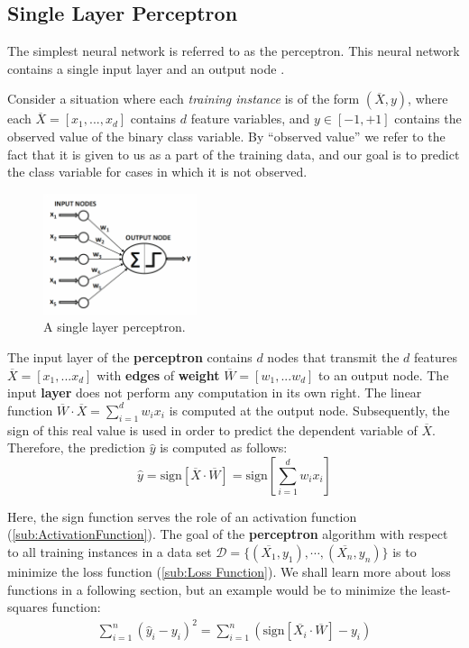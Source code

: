 \documentclass{article}
\begin{document}
\subsection{Single Layer Perceptron} \label{sub:Single Layer Perceptron}
The simplest neural network is referred to as the perceptron. This neural network contains
a single input layer and an output node \citep{inbook:Aggarwal-1.2}.

Consider a situation where each \textit{training instance} is of the form $(\overline{X}, y)$, where each $\overline{X} = [x_1,..., x_d]$ contains $d$ feature variables, and $y \in [-1, +1]$ contains the observed value of the binary class variable. By “observed value” we refer to the fact that it is given to us as a part of the training data, and our goal is to predict the class variable for cases in which it is not observed.

\begin{figure} %
    \centering
    \includegraphics[width=0.4\textwidth]{SingleLayerP}
    
    \caption{A single layer perceptron.}
\end{figure}

The input layer of the \textbf{perceptron} contains $d$ nodes that transmit the $d$ features $\overline{X} = [x_1, . . . x_d]$ with \textbf{edges} of \textbf{weight} $\overline{W} = [w_1, . . . w_d]$  to an output node. The input \textbf{layer} does not perform any computation in its own right. The linear function $\overline{W} \cdot \overline{X} =\sum^{d}_{i=1}  w_ix_i$ is computed at the output node. Subsequently, the sign of this real value is used in order to predict the dependent variable of $\overline{X}$. Therefore, the prediction $\hat y$ is computed as follows:
    $$\hat y = \text{sign}[\overline{X} \cdot \overline{W}] =\text{sign}\left[\sum^{d}_{i=1}  w_ix_i\right] $$

Here, the sign function serves the role of an activation function (\ref{sub:ActivationFunction}). The goal of the \textbf{perceptron} algorithm with respect to all training instances in a data set $\mathcal{D} = \{(\overline{X_1}, y_1 ), \cdots,(\overline{X_n}, y_n )\}$ is to minimize the loss function (\ref{sub:Loss Function}). We shall learn more about loss functions in a following section, but an example would be to minimize the least-squares function: 
 \begin{equation*}
  \begin{split}
    \sum^{n}_{i=1} (\hat y_i - y_i)^2 =\sum^{n}_{i=1} \left(\text{sign}[\overline{X_i} \cdot \overline{W}] -y_i \right)
  \end{split}
 \end{equation*}
\end{document}
